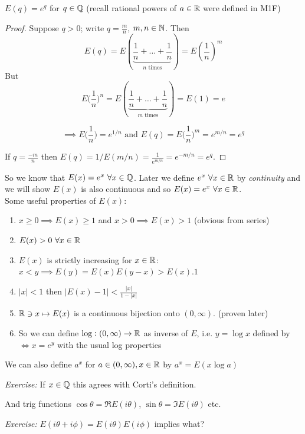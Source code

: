 \documentclass[10pt,twoside]{scrartcl}
\begin{document}
\begin{proposition}
$E(q) = e^q$ for $q \in\mathbb{Q}$ (recall rational powers of $a \in\mathbb{R}$ were defined in M1F)	
\end{proposition}
\begin{proof}
	Suppose $q > 0$; write $q = \frac{m}{n}$, $m,n \in\mathbb{N}$. Then 
	\[E(q) = E(\underbrace{\textstyle{\frac{1}{n} + \dots + \frac{1}{n}}}_{n \text{ times}}) = E(\frac{1}{n})^m\]
	But \[E\textstyle{(\frac{1}{n}})^n = E(\underbrace{\textstyle{\frac{1}{n} + \dots + \frac{1}{n}}}_{m \text{ times}}) = E(1) = e\]
	
	\[ \implies E\textstyle{(\frac{1}{n}}) = e^{1/n}\text{ and }E(q) = E\textstyle{(\frac{1}{n}})^m = e^{m/n} = e^q\]
	
	If $q = \frac{-m}{n}$ then $E(q) = 1/E(m/n) = \frac{1}{e^{m/n}} = e^{-m/n} = e^q$.
\end{proof}

So we know that $E(x) = e^x ~\forall x \in\mathbb{Q}$. Later we define $e^x~\forall x\in\mathbb{R}$ by \emph{continuity} and we will show $E(x)$ is also continuous and so $E(x) = e^x~\forall x\in\mathbb{R}$. \\
 
 
Some  useful properties of $E(x)$:
\begin{enumerate}
\item $x \geq 0 \implies E(x) \geq 1$ and $x > 0 \implies E(x) > 1$ (obvious from series)
\item $E(x) > 0~\forall x \in\mathbb{R}$
\item $E(x)$ is strictly increasing for $x\in\mathbb{R}$: $x < y \implies E(y) = E(x)E(y-x) > E(x).1$
\item $|x| < 1$ then $|E(x) - 1| < \frac{|x|}{1-|x|}$
\item $\mathbb{R} \ni x \mapsto E(x)$ is a continuous bijection onto $(0,\infty)$. (proven later)
\item So we can define $\log: (0,\infty) \to \mathbb{R}$ as inverse of $E$, i.e. $y = \log x$ defined by $\iff x = e^y$ with the usual log properties
\end{enumerate}\vspace*{5pt}

We can also define $a^x$ for $a \in(0,\infty),x\in \mathbb{R}$ by $a^x = E(x\log a)$

\emph{Exercise:} If $x \in\mathbb{Q}$ this agrees with Corti's definition. 

And trig functions $\cos \theta = \Re E(i\theta)$, $\sin \theta = \Im E(i\theta)$ etc. 

\emph{Exercise:} $E(i\theta + i\phi) = E(i\theta)E(i\phi)$ implies what?
	
\end{document}
